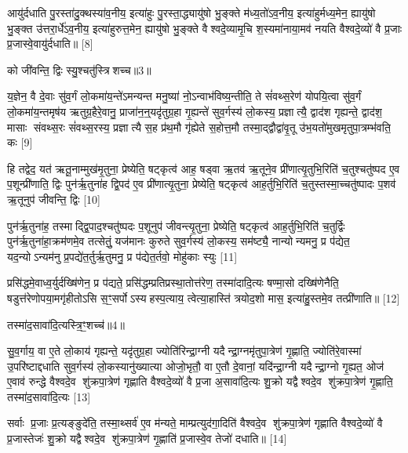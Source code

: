 आयु॑र्दधाति पु॒रस्ता॑दु॒क्थस्या॑व॒नीय॒ इत्या॑हुः पु॒रस्ता॒द्ध्यायु॑षो भु॒ङ्क्ते म॑ध्य॒तो॑ऽव॒नीय॒ इत्या॑हुर्मध्य॒मेन॒ ह्यायु॑षो भु॒ङ्क्त उ॑त्तरा॒र्धे॑ऽव॒नीय॒ इत्या॑हुरुत्त॒मेन॒ ह्यायु॑षो भु॒ङ्क्ते वैश्वदे॒व्यामृ॒चि श॒स्यमा॑नाया॒मव॑ नयति वैश्वदे॒व्यो॑ वै प्र॒जाः प्र॒जास्वे॒वायु॑र्दधाति॥ [8]

{\scriptsize {को जी॑वन्ति॒ द्विः स्यु॒श्चतु॑स्त्रिशच्च॥3॥}}

य॒ज्ञेन॒ वै दे॒वाः सु॑व॒र्गं लो॒कमा॑य॒न्ते॑ऽमन्यन्त मनु॒ष्या॑ नो॒ऽन्वाभ॑विष्य॒न्तीति॒ ते सं॑वथ्स॒रेण॑ योपयि॒त्वा सु॑व॒र्गं लो॒कमा॑य॒न्तमृष॑य ऋतुग्र॒हैरे॒वानु॒ प्राजा॑न॒न्॒यदृ॑तुग्र॒हा गृ॒ह्यन्ते॑ सुव॒र्गस्य॑ लो॒कस्य॒ प्रज्ञात्यै॒ द्वाद॑श गृह्यन्ते॒ द्वाद॑श॒ मासाः संवथ्स॒रः सं॑वथ्स॒रस्य॒ प्रज्ञात्यै स॒ह प्र॑थ॒मौ गृ॑ह्येते स॒होत्त॒मौ तस्मा॒द्द्वौद्वा॑वृ॒तू उ॑भ॒यतो॑मुखमृतुपा॒त्रम्भ॑वति॒ कः [9]

हि तद्वेद॒ यत॑ ऋतू॒नाम्मुख॑मृ॒तुना॒ प्रेष्येति॒ षट्कृत्व॑ आह॒ षड्वा ऋ॒तव॑ ऋ॒तूने॒व प्री॑णात्यृ॒तुभि॒रिति॑ च॒तुश्चतु॑ष्पद ए॒व प॒शून्प्री॑णाति॒ द्विः पुन॑र्\mbox{}ऋ॒तुना॑ह द्वि॒पद॑ ए॒व प्री॑णात्यृ॒तुना॒ प्रेष्येति॒ षट्कृत्व॑ आह॒र्तुभि॒रिति॑ च॒तुस्तस्मा॒च्चतु॑ष्पादः प॒शव॑ ऋ॒तूनुप॑ जीवन्ति॒ द्विः [10]

पुन॑र्\mbox{}ऋ॒तुना॑ह॒ तस्माद्द्वि॒पाद॒श्चतु॑ष्पदः प॒शूनुप॑ जीवन्त्यृ॒तुना॒ प्रेष्येति॒ षट्कृत्व॑ आह॒र्तुभि॒रिति॑ च॒तुर्द्विः पुन॑र्\mbox{}ऋ॒तुना॑हा॒क्रम॑णमे॒व तत्सेतुं॒ यज॑मानः कुरुते सुव॒र्गस्य॑ लो॒कस्य॒ सम॑ष्ट्यै॒ नान्योन्यमनु॒ प्र प॑द्येत॒ यद॒न्योऽन्यम॑नु प्र॒पद्ये॑त॒र्तुर्\mbox{}ऋ॒तुमनु॒ प्र प॑द्येत॒र्तवो॒ मोहु॑काः स्युः [11]

प्रसि॑द्धमे॒वाध्व॒र्युर्दख्षि॑णेन॒ प्र प॑द्यते॒ प्रसि॑द्धम्प्रतिप्रस्था॒तोत्त॑रेण॒ तस्मा॑दादि॒त्यः षण्मा॒सो दख्षि॑णेनैति॒ षडुत्त॑रेणोपया॒मगृ॑हीतोऽसि स॒ꣳ॒सर्पोऽस्यहस्प॒त्याय॒ त्वेत्या॒हास्ति॑ त्रयोद॒शो मास॒ इत्या॑हु॒स्तमे॒व तत्प्री॑णाति॥ [12]

{\scriptsize {तस्मा॑द॒सावा॑दि॒त्यस्त्रि॒ꣳ॒शच्च॑॥4॥}}

सु॒व॒र्गाय॒ वा ए॒ते लो॒काय॑ गृह्यन्ते॒ यदृ॑तुग्र॒हा ज्योति॑रिन्द्रा॒ग्नी यदैन्द्रा॒ग्नमृ॑तुपा॒त्रेण॑ गृ॒ह्णाति॒ ज्योति॑रे॒वास्मा॑ उ॒परि॑ष्टाद्दधाति सुव॒र्गस्य॑ लो॒कस्यानु॑ख्यात्या ओजो॒भृतौ॒ वा ए॒तौ दे॒वानां॒ यदि॑न्द्रा॒ग्नी यदैन्द्रा॒ग्नो गृ॒ह्यत॒ ओज॑ ए॒वाव॑ रुन्द्धे वैश्वदे॒व शु॑क्रपा॒त्रेण॑ गृह्णाति वैश्वदे॒व्यो॑ वै प्र॒जा अ॒सावा॑दि॒त्यः शु॒क्रो यद्वैश्वदे॒व शु॑क्रपा॒त्रेण॑ गृ॒ह्णाति॒ तस्मा॑द॒सावा॑दि॒त्यः [13]

सर्वाः प्र॒जाः प्र॒त्यङ्ङुदे॑ति॒ तस्मा॒थ्सर्व॑ ए॒व म॑न्यते॒ माम्प्रत्युद॑गा॒दिति॑ वैश्वदे॒व शु॑क्रपा॒त्रेण॑ गृह्णाति वैश्वदे॒व्यो॑ वै प्र॒जास्तेजः॑ शु॒क्रो यद्वैश्वदे॒व शु॑क्रपा॒त्रेण॑ गृ॒ह्णाति॑ प्र॒जास्वे॒व तेजो॑ दधाति॥ [14]

